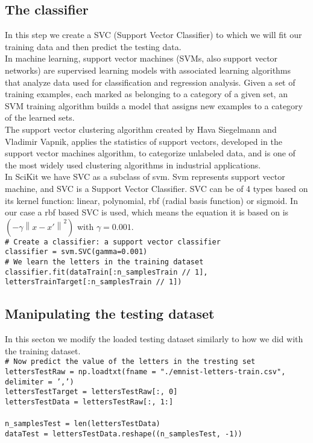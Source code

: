 \documentclass[a4paper,10pt]{report}
\newcommand{\code}[1]{\colorbox{light-gray}{\texttt{#1}}}
\begin{document}
 \subsection{The classifier}
 In this step we create a SVC (Support Vector Classifier) to which we will fit our training data and then predict the testing data.\\
 In machine learning, support vector machines (SVMs, also support vector networks) are supervised learning models with associated learning algorithms that analyze data used for classification and regression analysis. Given a set of training examples, each marked as belonging to a category of a given set, an SVM training algorithm builds a model that assigns new examples to a category of the learned sets.\\
 The support vector clustering algorithm created by Hava Siegelmann and Vladimir Vapnik, applies the statistics of support vectors, developed in the support vector machines algorithm, to categorize unlabeled data, and is one of the most widely used clustering algorithms in industrial applications.\\
 In SciKit we have SVC as a subclass of svm. Svm represents support vector machine, and SVC is a Support Vector Classifier. SVC can be of 4 types based on its kernel function: linear, polynomial, rbf (radial basis function) or sigmoid. In our case a rbf based SVC is used, which means the equation it is based on is \((-\gamma \left \| x - {x}' \right \|^{2})\) with \(\gamma = 0.001\). \\
 \code{\# Create a classifier: a support vector classifier}\\
 \code{classifier = svm.SVC(gamma=0.001)}\\
 \code{\# We learn the letters in the training dataset}\\
 \code{classifier.fit(dataTrain[:n\_samplesTrain // 1], lettersTrainTarget[:n\_samplesTrain // 1])}\\
 
 \subsection{Manipulating the testing dataset}
 In this secton we modify the loaded testing dataset similarly to how we did with the training dataset.\\
 
 \code{\# Now predict the value of the letters in the tresting set}\\
 \code{lettersTestRaw = np.loadtxt(fname = "./emnist-letters-train.csv", delimiter = ',')}\\
 \code{lettersTestTarget = lettersTestRaw[:, 0]}\\
 \code{lettersTestData = lettersTestRaw[:, 1:]}\\
 \code{}\\
 \code{n\_samplesTest = len(lettersTestData)}\\
 \code{dataTest = lettersTestData.reshape((n\_samplesTest, -1))}\\
\end{document}
